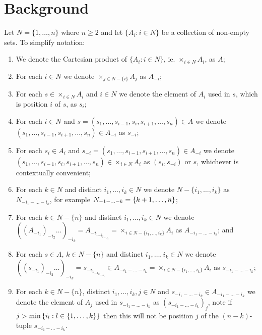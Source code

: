 \section{Background} \label{sec:background}
	Let $N = \{1, \ldots, n\}$ where $n \geq 2$ and let $\{A_i: i \in N\}$ be a collection of non-empty sets. To simplify notation:
	\begin{enumerate}
		\item We denote the Cartesian product of $\{A_i: i \in N\}$, ie. $\times_{i \in N}A_i$, as $A$;
		\item For each $i \in N$ we denote $\times_{j \in N-\{i\}} A_j$ as $A_{-i}$;
		\item For each $s \in \times_{i \in N}A_i$ and $i \in N$ we denote the element of $A_i$ used in $s$, which is position $i$ of $s$, as $s_i$;
		\item For each $i \in N$ and $s = (s_1, \ldots, s_{i-1}, s_i, s_{i+1}, \ldots, s_n) \in A$ we denote $(s_1, \ldots, s_{i-1}, s_{i+1}, \ldots, s_n) \in A_{-i}$ as $s_{-i}$;
		\item For each $s_i \in A_i$ and $s_{-i} = (s_1, \ldots, s_{i-1}, s_{i+1}, \ldots, s_n) \in A_{-i}$ we denote $(s_1, \ldots, s_{i-1}, s_i, s_{i+1}, \ldots, s_n) \in \times_{i \in N} A_i$ as $(s_i, s_{-i})$ or $s$, whichever is contextually convenient;
		\item For each $k \in N$ and distinct $i_1, \ldots, i_k \in N$ we denote $N - \{i_1, \ldots, i_k\}$ as $N_{-i_1 - \ldots - i_k}$, for example $N_{-1 - \ldots - k} = \left\{k+1, \ldots, n\right\}$;
		\item For each $k \in N-\{n\}$ and distinct $i_1, \ldots, i_k \in N$ we denote ${\left({(A_{-i_1})}_{-i_2}\ldots\right)}_{-i_k} = A_{{-i_1}_{{-i_2}_{\ldots_{-i_k}}}} = \times_{i \in N-\{i_1, \ldots, i_k\}}A_i$ as $A_{-i_1 - \ldots - i_k}$; and
		\item For each $s \in A$, $k \in N-\{n\}$ and distinct $i_1, \ldots, i_k \in N$ we denote ${\left({(s_{-i_1})}_{-i_2}\ldots\right)}_{-i_k} = s_{{-i_1}_{{-i_2}_{\ldots_{-i_k}}}} \in A_{-i_1 - \ldots - i_k} = \times_{i \in N-\{i_1, \ldots, i_k\}}A_i$ as $s_{-i_1 - \ldots - i_k}$;
		\item For each $k \in N-\{n\}$, distinct $i_1, \ldots, i_k, j \in N$ and $s_{-i_1 - \ldots - i_k} \in A_{-i_1 - \ldots - i_k}$ we denote the element of $A_j$ used in $s_{-i_1 - \ldots - i_k}$ as ${(s_{-i_1 - \ldots - i_k})}_j$, note if $j>\min\left\{i_l: l\in\{1, \ldots, k\}\right\}$ then this will not be position $j$ of the $(n-k)$-tuple $s_{-i_1 - \ldots - i_k}$.
	\end{enumerate}
	
